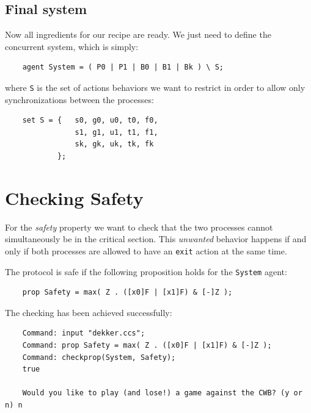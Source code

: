 \documentclass[10pt,a4paper]{article}
\newcommand{\CCSCode}[1]{{\tt #1}}
\begin{document}
    \subsection{Final system}

        Now all ingredients for our recipe are ready. We just need to
        define the concurrent system, which is simply:
        \begin{verbatim}
    agent System = ( P0 | P1 | B0 | B1 | Bk ) \ S;
        \end{verbatim}
        where \CCSCode{S} is the set of actions behaviors we want to
        restrict in order to allow only synchronizations between the
        processes:
        \begin{verbatim}
    set S = {   s0, g0, u0, t0, f0,
                s1, g1, u1, t1, f1,
                sk, gk, uk, tk, fk
            };
        \end{verbatim}

\section{Checking Safety}

    For the \emph{safety} property we want to check that the two
    processes cannot simultaneously be in the critical section.
    This \emph{unwanted} behavior happens if and only if both
    processes are allowed to have an \CCSCode{exit} action at the same
    time.

    The protocol is safe if the following proposition holds for the
    \CCSCode{System} agent:
    \begin{verbatim}
    prop Safety = max( Z . ([x0]F | [x1]F) & [-]Z );
    \end{verbatim}

    The checking has been achieved successfully:
    \begin{verbatim}
    Command: input "dekker.ccs";
    Command: prop Safety = max( Z . ([x0]F | [x1]F) & [-]Z );
    Command: checkprop(System, Safety);
    true

    Would you like to play (and lose!) a game against the CWB? (y or n) n
    \end{verbatim}
\end{document}
